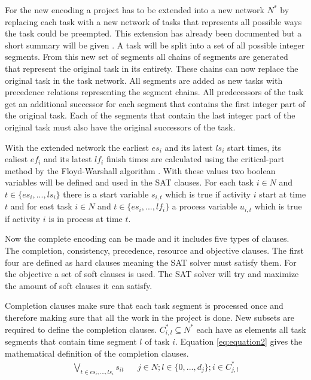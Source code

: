 For the new encoding a project has to be extended into a new network \(N^*\) by replacing each task with a new network of tasks that represents all possible ways the task could be preempted. This extension has already been documented but a short summary will be given \cite{RN1}. A task will be split into a set of all possible integer segments. From this new set of segments all chains of segments are generated that represent the original task in its entirety. These chains can now replace the original task in the task network. All segments are added as new tasks with precedence relations representing the segment chains. All predecessors of the task get an additional successor for each segment that contains the first integer part of the original task. Each of the segments that contain the last integer part of the original task must also have the original successors of the task.

With the extended network the earliest \(es_i\) and its latest \(ls_i\) start times, its ealiest \(ef_i\) and its latest \(lf_i\) finish times are calculated using the critical-part method by the Floyd-Warshall algorithm \cite{RN53}. With these values two boolean variables will be defined and used in the SAT clauses. For each task \(i \in N\) and \(t \in \{es_i,...,ls_i\}\) there is a start variable \(s_{i,t}\) which is true if activity \(i\) start at time \(t\) and for east task \(i \in N\) and \(t \in \{es_i,...,lf_i\}\) a process variable \(u_{i,t}\) which is true if activity \(i\) is in process at time \(t\).

Now the complete encoding can be made and it includes five types of clauses. The completion, consistency, precedence, resource and objective clauses. The first four are defined as hard clauses meaning the SAT solver must satisfy them. For the objective a set of soft clauses is used. The SAT solver will try and maximize the amount of soft clauses it can satisfy.

Completion clauses make sure that each task segment is processed once and therefore making sure that all the work in the project is done. New subsets are required to define the completion clauses. \(C^*_{i,l} \subseteq N^*\) each have as elements all task segments that contain time segment \(l\) of task \(i\). Equation \ref{eq:equation2} gives the mathematical definition of the completion clauses.
\begin{align}\label{eq:equation2}
\bigvee_{t\in {es_i,...,ls_i}} s_{it}   &&  j\in N; l\in \{0,...,d_j\}; i\in C^*_{j,l}
\end{align}

